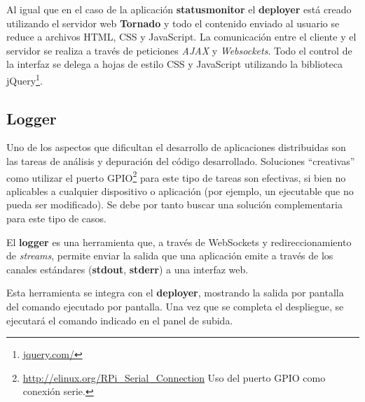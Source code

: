 Al igual que en el caso de la aplicación \textbf{statusmonitor} el \textbf{deployer} está creado utilizando el servidor web \textbf{Tornado} y todo el contenido enviado al usuario se reduce a archivos HTML, CSS y JavaScript. La comunicación entre el cliente y el servidor se realiza a través de peticiones \textit{AJAX} y \textit{Websockets}. Todo el control de la interfaz se delega a hojas de estilo CSS y JavaScript utilizando la biblioteca jQuery\footnote{\href{https://jquery.com/}{jquery.com/}}.






\subsection{Logger}

Uno de los aspectos que dificultan el desarrollo de aplicaciones distribuidas son las tareas de análisis y depuración del código desarrollado. Soluciones ``creativas'' como utilizar el puerto GPIO\footnote{\href{http://elinux.org/RPi\_Serial\_Connection}{http://elinux.org/RPi\_Serial\_Connection} Uso del puerto GPIO como conexión serie.} para este tipo de tareas son efectivas, si bien no aplicables a cualquier dispositivo o aplicación (por ejemplo, un ejecutable que no pueda ser modificado). Se debe por tanto buscar una solución complementaria para este tipo de casos.

El \textbf{logger} es una herramienta que, a través de WebSockets y redireccionamiento de \textit{streams}, permite enviar la salida que una aplicación emite a través de los canales estándares (\textbf{stdout}, \textbf{stderr}) a una interfaz web.

Esta herramienta se integra con el \textbf{deployer}, mostrando la salida por pantalla del comando ejecutado por pantalla. Una vez que se completa el despliegue, se ejecutará el comando indicado en el panel de subida.

